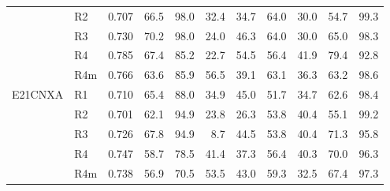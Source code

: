 \begin{table}[h]
\begin{tabular}{@{}llrrrrrrrrr@{}}
 & R2 & 0.707 & 66.5 & 98.0 & 32.4 & 34.7 & 64.0 & 30.0 & 54.7 & 99.3 \\
 & R3 & 0.730 & 70.2 & 98.0 & 24.0 & 46.3 & 64.0 & 30.0 & 65.0 & 98.3 \\
 & R4 & 0.785 & 67.4 & 85.2 & 22.7 & 54.5 & 56.4 & 41.9 & 79.4 & 92.8 \\
 & R4m & 0.766 & 63.6 & 85.9 & 56.5 & 39.1 & 63.1 & 36.3 & 63.2 & 98.6 \\
\addlinespace
E21CNXA & R1 & 0.710 & 65.4 & 88.0 & 34.9 & 45.0 & 51.7 & 34.7 & 62.6 & 98.4 \\
 & R2 & 0.701 & 62.1 & 94.9 & 23.8 & 26.3 & 53.8 & 40.4 & 55.1 & 99.2 \\
 & R3 & 0.726 & 67.8 & 94.9 & 8.7 & 44.5 & 53.8 & 40.4 & 71.3 & 95.8 \\
 & R4 & 0.747 & 58.7 & 78.5 & 41.4 & 37.3 & 56.4 & 40.3 & 70.0 & 96.3 \\
 & R4m & 0.738 & 56.9 & 70.5 & 53.5 & 43.0 & 59.3 & 32.5 & 67.4 & 97.3 \\
\bottomrule
\end{tabular}
\end{table}
